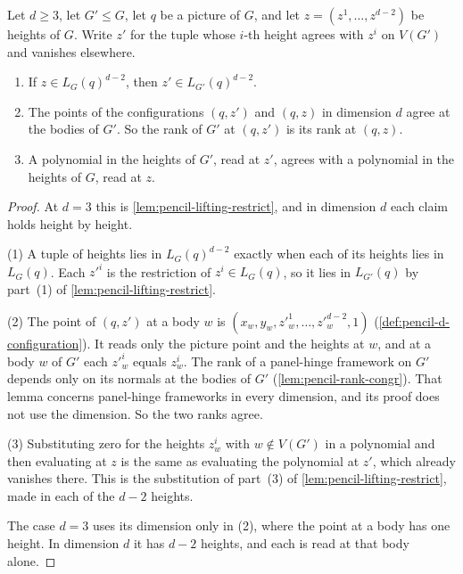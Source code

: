 \begin{lemma}
  \label{lem:pencil-d-lifting-restrict}
  \leanok
  Let $d \ge 3$, let $G' \le G$, let $q$ be a picture of $G$, and let
  $z = (z^1, \dots, z^{d-2})$ be heights of $G$. Write $z'$ for the tuple
  whose $i$-th height agrees with $z^i$ on $V(G')$ and vanishes
  elsewhere.
  \begin{enumerate}
    \item If $z \in L_G(q)^{d-2}$, then $z' \in L_{G'}(q)^{d-2}$.
    \item The points of the configurations $(q, z')$ and $(q, z)$ in
      dimension $d$ agree at the bodies of $G'$. So the rank of $G'$ at
      $(q, z')$ is its rank at $(q, z)$.
    \item A polynomial in the heights of $G'$, read at $z'$, agrees with
      a polynomial in the heights of $G$, read at $z$.
  \end{enumerate}
\end{lemma}
\begin{proof}
  \leanok
  At $d = 3$ this is \cref{lem:pencil-lifting-restrict}, and in dimension
  $d$ each claim holds height by height.

  (1) A tuple of heights lies in $L_G(q)^{d-2}$ exactly when each of its
  heights lies in $L_G(q)$. Each $z'^i$ is the restriction of
  $z^i \in L_G(q)$, so it lies in $L_{G'}(q)$ by part~(1) of
  \cref{lem:pencil-lifting-restrict}.

  (2) The point of $(q, z')$ at a body $w$ is
  $(x_w, y_w, z'^1_w, \dots, z'^{d-2}_w, 1)$
  (\cref{def:pencil-d-configuration}). It reads only the picture point and
  the heights at $w$, and at a body $w$ of $G'$ each $z'^i_w$ equals
  $z^i_w$. The rank of a panel-hinge framework on $G'$ depends only on its
  normals at the bodies of $G'$ (\cref{lem:pencil-rank-congr}). That lemma
  concerns panel-hinge frameworks in every dimension, and its proof does
  not use the dimension. So the two ranks agree.

  (3) Substituting zero for the heights $z^i_w$ with $w \notin V(G')$ in a
  polynomial and then evaluating at $z$ is the same as evaluating the
  polynomial at $z'$, which already vanishes there. This is the
  substitution of part~(3) of \cref{lem:pencil-lifting-restrict}, made in
  each of the $d - 2$ heights.

  The case $d = 3$ uses its dimension only in (2), where the point at a
  body has one height. In dimension $d$ it has $d - 2$ heights, and each
  is read at that body alone.
\end{proof}

